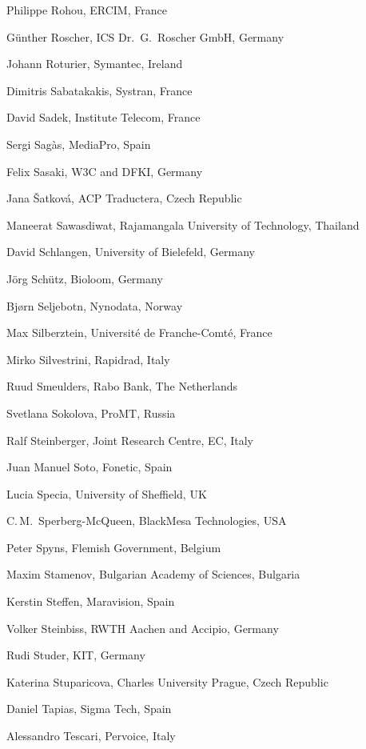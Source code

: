 \documentclass[10pt, plain]{../../metanetpaper}
\begin{document}
\begin{multicols}{3}
\begin{small}
\begin{enumerate}
{      \item Philippe Rohou, ERCIM, France
      \item Günther Roscher, ICS Dr.~G.~Roscher GmbH, Germany
      \item Johann Roturier, Symantec, Ireland
      \item Dimitris Sabatakakis, Systran, France
      \item David Sadek, Institute Telecom, France
      \item Sergi Sagàs, MediaPro, Spain
      \item Felix Sasaki, W3C and DFKI, Germany
      \item Jana Šatková, ACP Traductera, Czech Republic
      \item Maneerat Sawasdiwat, Rajamangala University of Technology, Thailand
      \item David Schlangen, University of Bielefeld, Germany
      \item Jörg Schütz, Bioloom, Germany
      \item Bjørn Seljebotn, Nynodata, Norway
      \item Max Silberztein, Université de Franche-Comté, France
      \item Mirko Silvestrini, Rapidrad, Italy
      \item Ruud Smeulders, Rabo Bank, The Netherlands
      \item Svetlana Sokolova, ProMT, Russia
      \item Ralf Steinberger, Joint Research Centre, EC, Italy
      \item Juan Manuel Soto, Fonetic, Spain
      \item Lucia Specia, University of Sheffield, UK
      \item C.\,M.~Sperberg-McQueen, BlackMesa Technologies, USA
      \item Peter Spyns, Flemish Government, Belgium
      \item Maxim Stamenov, Bulgarian Academy of Sciences, Bulgaria
      \item Kerstin Steffen, Maravision, Spain
      \item Volker Steinbiss, RWTH Aachen and Accipio, Germany
      \item Rudi Studer, KIT, Germany
      \item Katerina Stuparicova, Charles University Prague, Czech Republic
      \item Daniel Tapias, Sigma Tech, Spain
      \item Alessandro Tescari, Pervoice, Italy
}
\end{enumerate}
\end{small}
\end{multicols}
\end{document}
